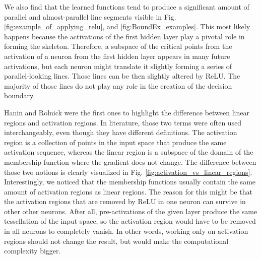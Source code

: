 \documentclass{article}
\begin{document}
We also find that the learned functions tend to produce a significant amount of parallel and almost-parallel line segments visible in Fig. \ref{fig:example_of_applying_relu}, and \ref{fig:BoundEx_examples}. This most likely happens because the activations of the first hidden layer play a pivotal role in forming the skeleton. Therefore, a subspace of the critical points from the activation of a neuron from the first hidden layer appears in many future activations, but each neuron might translate it slightly forming a series of parallel-looking lines. Those lines can be then slightly altered by ReLU. The majority of those lines do not play any role in the creation of the decision boundary.


Hanin and Rolnick \cite{hanin2019complexity, hanin2019deep} were the first ones to highlight the difference between linear regions and activation regions. In literature, those two terms were often used interchangeably, even though they have different definitions. The activation region is a collection of points in the input space that produce the same activation sequence, whereas the linear region is a subspace of the domain of the membership function where the gradient does not change. The difference between those two notions is clearly visualized in Fig. \ref{fig:activation_vs_linear_regions}. Interestingly, we noticed that the membership functions usually contain the same amount of activation regions as linear regions. The reason for this might be that the activation regions that are removed by ReLU in one neuron can survive in other other neurons. After all, pre-activations of the given layer produce the same tessellation of the input space, so the activation region would have to be removed in all neurons to completely vanish. In other words, working only on activation regions should not change the result, but would make the computational complexity bigger.
\end{document}
